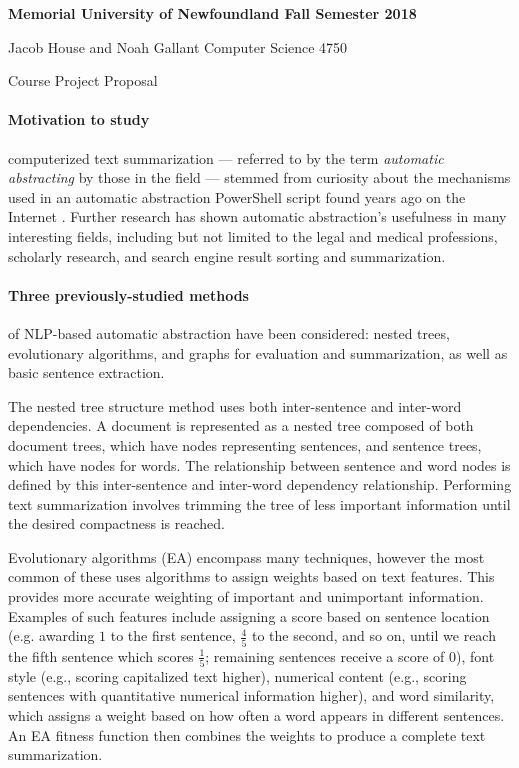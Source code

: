 \documentclass{article}
\begin{document}
	{
		\parindent=0pt
		\bfseries
		Memorial University of Newfoundland \hfill Fall Semester 2018 
		
		Jacob House and Noah Gallant \hfill Computer Science 4750
		
		\vskip 2pc
		
		{
			\Large \hfill Course Project Proposal \hfill
		}
	}

	\vskip 1pc

	\paragraph{Motivation to study} computerized text summarization --- referred to by the term {\em automatic abstracting}  by those in the field --- stemmed from curiosity about the mechanisms used in an automatic abstraction PowerShell script found years ago on the Internet \cite{PSScript}. Further research has shown automatic abstraction's usefulness in many interesting fields, including but not limited to the legal and medical professions, scholarly research, and search engine result sorting and summarization.
	
	
	\paragraph{Three previously-studied methods} of NLP-based automatic abstraction have been considered: nested trees, evolutionary algorithms, and graphs for evaluation and summarization, as well as basic sentence extraction.
	
	The nested tree structure method uses both inter-sentence and inter-word dependencies. A document is represented as a nested tree composed of both document trees, which have nodes representing sentences, and sentence trees, which have nodes for words. The relationship between sentence and word nodes is defined by this inter-sentence and inter-word dependency relationship. Performing text summarization involves trimming the tree of less important information until the desired compactness is reached. \cite{art3}
	
	Evolutionary algorithms (EA) encompass many techniques, however the most common of these uses algorithms to assign weights based on text features. This provides more accurate weighting of important and unimportant information. Examples of such features include assigning a score based on sentence location (e.g. awarding $1$ to the first sentence, $\frac{4}{5}$ to the second, and so on, until we reach the fifth sentence which scores $\frac{1}{5}$; remaining sentences receive a score of $0$), font style (e.g., scoring capitalized text higher), numerical content (e.g., scoring sentences with quantitative numerical information higher), and word similarity, which assigns a weight based on how often a word appears in different sentences. An EA fitness function then combines the weights to produce a complete text summarization. \cite{art1}
	
\end{document}
